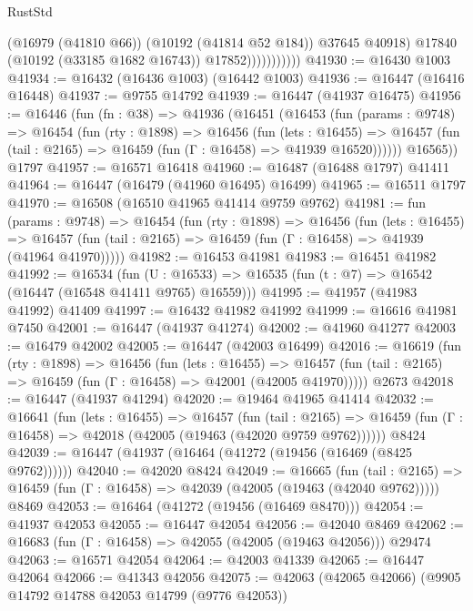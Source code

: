 \begin{lexlean}{RustStd}
\begin{coremodule}
                            (@16979 (@41810 @66))
                            (@10192 (@41814 @52 @184))
                            @37645
                            @40918)
                          @17840
                          (@10192 (@33185 @1682 @16743))
                          @17852)))))))))))
@41930 := @16430 @1003
@41934 := @16432 (@16436 @1003) (@16442 @1003)
@41936 := @16447 (@16416 @16448)
@41937 := @9755 @14792
@41939 := @16447 (@41937 @16475)
@41956 := @16446
    (fun (fn : @38) =>
    @41936
      (@16451
        (@16453
          (fun (params : @9748) =>
          @16454
            (fun (rty : @1898) =>
            @16456
              (fun (lets : @16455) =>
              @16457 (fun (tail : @2165) => @16459 (fun (Γ : @16458) => @41939 @16520))))))
        @16565))
    @1797
@41957 := @16571 @16418
@41960 := @16487 (@16488 @1797) @41411
@41964 := @16447 (@16479 (@41960 @16495) @16499)
@41965 := @16511 @1797
@41970 := @16508 (@16510 @41965 @41414 @9759 @9762)
@41981 := fun (params : @9748) =>
  @16454
    (fun (rty : @1898) =>
    @16456
      (fun (lets : @16455) =>
      @16457 (fun (tail : @2165) => @16459 (fun (Γ : @16458) => @41939 (@41964 @41970)))))
@41982 := @16453 @41981
@41983 := @16451 @41982
@41992 := @16534
    (fun (U : @16533) => @16535 (fun (t : @7) => @16542 (@16447 (@16548 @41411 @9765) @16559)))
@41995 := @41957 (@41983 @41992) @41409
@41997 := @16432 @41982 @41992
@41999 := @16616 @41981 @7450
@42001 := @16447 (@41937 @41274)
@42002 := @41960 @41277
@42003 := @16479 @42002
@42005 := @16447 (@42003 @16499)
@42016 := @16619
    (fun (rty : @1898) =>
    @16456
      (fun (lets : @16455) =>
      @16457 (fun (tail : @2165) => @16459 (fun (Γ : @16458) => @42001 (@42005 @41970)))))
    @2673
@42018 := @16447 (@41937 @41294)
@42020 := @19464 @41965 @41414
@42032 := @16641
    (fun (lets : @16455) =>
    @16457
      (fun (tail : @2165) =>
      @16459 (fun (Γ : @16458) => @42018 (@42005 (@19463 (@42020 @9759 @9762))))))
    @8424
@42039 := @16447 (@41937 (@16464 (@41272 (@19456 (@16469 (@8425 @9762))))))
@42040 := @42020 @8424
@42049 := @16665
    (fun (tail : @2165) => @16459 (fun (Γ : @16458) => @42039 (@42005 (@19463 (@42040 @9762)))))
    @8469
@42053 := @16464 (@41272 (@19456 (@16469 @8470)))
@42054 := @41937 @42053
@42055 := @16447 @42054
@42056 := @42040 @8469
@42062 := @16683 (fun (Γ : @16458) => @42055 (@42005 (@19463 @42056))) @29474
@42063 := @16571 @42054
@42064 := @42003 @41339
@42065 := @16447 @42064
@42066 := @41343 @42056
@42075 := @42063 (@42065 @42066) (@9905 @14792 @14788 @42053 @14799 (@9776 @42053))

\end{coremodule}
\end{lexlean}
